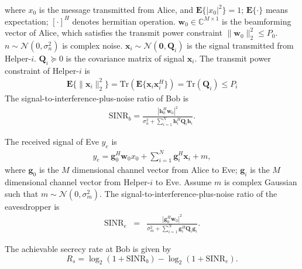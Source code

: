 \documentclass[journal]{IEEEtran}
\begin{document}
where $x_0$ is the message transmitted from Alice, and $\mathbf{E}\{|x_0|^2\} = 1$; $\mathbf{E}\{\cdot\}$ means expectation; $[\cdot]^H$ denotes hermitian operation. $\mathbf{w}_{0} \in \mathbb{C}^{M \times 1}$  is the beamforming vector of Alice, which satisfies the transmit power constraint $\|\mathbf{w}_0\|_2^2 \leq P_0$. $n \sim \mathcal{N}(0,\sigma_n^2)$ is complex noise. $\mathbf{x}_i \sim \mathcal{N}(\mathbf{0}, \mathbf{Q}_i)$ is the signal transmitted from Helper-$i$. $\mathbf{Q}_i \succeq 0$ is the covariance matrix of signal $\mathbf
{x}_i$. The transmit power constraint of Helper-$i$ is 
\begin{eqnarray}
\mathbf{E}\{\|\mathbf{x}_i\|_2^2\}  = \mathrm{Tr}(\mathbf{E}\{\mathbf{x}_i\mathbf{x}_i^H\} )= \mathrm{Tr}(\mathbf{Q}_i) \leq P_i
\end{eqnarray}
The signal-to-interference-plus-noise ratio of Bob is
\begin{eqnarray} \label{eq:SINR of Bob}
\mathrm{SINR}_b = \frac{\left| \mathbf{h}_{0}^H\mathbf{w}_{0}\right|^2}{\sigma_n^2 + \sum_{i=1}^{N}\mathbf{h}_{i}^H\mathbf{Q}_{i}\mathbf{h}_i}.
\end{eqnarray}

The received signal of Eve $y_e$ is
\begin{eqnarray}
y_e = \mathbf{g}_0^H\mathbf{w}_0x_0 + \sum_{i = 1}^N\mathbf{g}_i^H\mathbf{x}_i + m,
\end{eqnarray}
where $\mathbf{g}_0$ is the $M$ dimensional channel vector from Alice to Eve; $\mathbf{g}_i$ is the $M$ dimensional channel vector from Helper-$i$ to Eve.   Assume $m$ is complex Gaussian such that $m \sim \mathcal{N}(0,\sigma_m^2)$.
The signal-to-interference-plus-noise ratio of the eavesdropper is
\begin{eqnarray}
\mathrm{SINR}_e &=& \frac{\left| \mathbf{g}_{0}^H\mathbf{w}_{0}\right|^2}{\sigma_m^2 + \sum_{i=1}^{N}\mathbf{g}_{i}^H\mathbf{Q}_{i}\mathbf{g}_i} \label{eq:secure_capacity}.
\end{eqnarray}

The achievable secrecy rate at Bob is given by \cite{6728676}
\begin{equation}
R_s = \log_2\left(1 + \mathrm{SINR}_b\right)-\log_2\left(1 + \mathrm{SINR}_e\right).
\end{equation}
\end{document}
